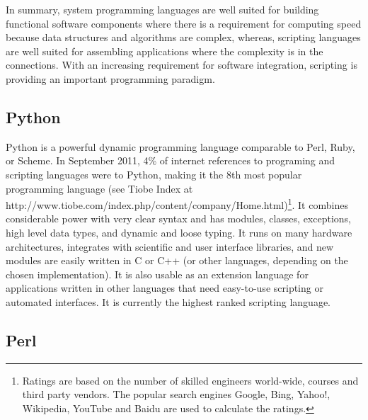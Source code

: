 \documentclass[10pt]{article}
\begin{document}
In summary, system programming languages are well suited for building functional software
components where there is a requirement for computing speed because data structures and
algorithms are complex, whereas, scripting languages are well suited for assembling
applications where the complexity is in the connections. With an
increasing requirement for software integration, scripting is
providing an important programming paradigm.





\subsection*{Python}

Python is a powerful dynamic programming language comparable to Perl,
Ruby, or Scheme. In September 2011, 4\% of internet references to programing and scripting languages were to Python, making it the 8th most popular programming
language (see Tiobe Index at http://www.tiobe.com/index.php/content/company/Home.html)\footnote{Ratings are based on the number of skilled engineers world-wide, courses and third party vendors. The popular search engines Google, Bing, Yahoo!, Wikipedia, YouTube and Baidu are used to calculate the ratings.}.  It combines
considerable power with very clear syntax and has modules, classes,
exceptions, high level data types, and dynamic and loose typing. It
runs on many hardware architectures, integrates with scientific and
user interface libraries, and new modules are easily written in C or
C++ (or other languages, depending on the chosen implementation). It
is also usable as an extension language for applications written in
other languages that need easy-to-use scripting or automated
interfaces.  It is currently the highest ranked scripting language.


\subsection*{Perl}
\end{document}
